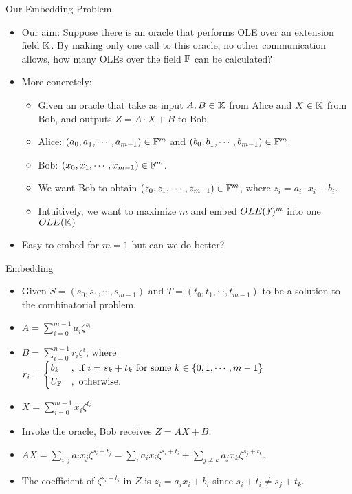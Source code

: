 \begin{frame}{Our Embedding Problem}
	\begin{itemize}
	\item Our aim: Suppose there is an oracle that performs OLE over an extension field $ {\mathbb K} $. By making only one call to this oracle, no other communication allows, how many OLEs over the field $ {\mathbb F} $ can be calculated? %
	\item More concretely: 
	\begin{itemize}
		\item Given an oracle that take as input $ A, B \in {\mathbb K}  $ from Alice and $ X \in {\mathbb K} $ from Bob, and outputs $ Z = A\cdot X + B $ to Bob. %
		
		\item  Alice: $ (a_0, a_1, \cdots, a_{m-1}) \in {\mathbb F}^m $ and $ (b_0, b_1, \cdots, b_{m-1}) \in {\mathbb F}^m $. %
		\item  Bob: $ (x_0, x_1, \cdots, x_{m-1}) \in {\mathbb F}^m $. %
		\item  We want Bob to obtain $ (z_0, z_1, \cdots, z_{m-1}) \in {\mathbb F}^m $, where $ z_i = a_i \cdot x_i + b_i $. %
		\item Intuitively, we want to maximize $ m $ and embed $ OLE({\mathbb F})^m $ into one $ OLE({\mathbb K}) $ %
	\end{itemize}
	\item Easy to embed for $ m = 1 $ but can we do better? 
\end{itemize}
\end{frame}

\begin{frame}{Embedding}
	\begin{itemize}
		\item Given $ S = (s_0, s_1, \cdots, s_{m-1}) $ and $ T = (t_0, t_1, \cdots, t_{m-1}) $ to be a solution to the combinatorial problem. %
		\item $  A = \sum_{i = 0}^{m-1} a_i \zeta^{s_i} $ %
		\item $ B = \sum_{i=0}^{n-1} r_i \zeta^i $, where \\ $ r_i = \begin{cases}
		b_k & ,\text{ if } i = s_k + t_k \text{ for some } k \in \{0, 1, \cdots, m-1\} \\
		U_{{\mathbb F}} & ,\text{ otherwise.}
		\end{cases} $ %
		\item $ X = \sum_{i=0}^{m-1} x_i \zeta^{t_i} $ %
		\item Invoke the oracle, Bob receives $ Z = AX + B $. %
		\item $ A X = \sum\limits_{i,j} a_i x_j \zeta^{s_i + t_j} = \sum\limits_{i} a_i x_i \zeta^{s_i + t_i} + \sum\limits_{j \neq k} a_j x_k \zeta^{s_j + t_k} $. %
		\item The coefficient of $ \zeta^{s_i + t_i} $ in $ Z $ is $ z_i = a_i x_i + b_i $ since $ s_i + t_i \neq s_j + t_k $.
	\end{itemize}
	
\end{frame}

